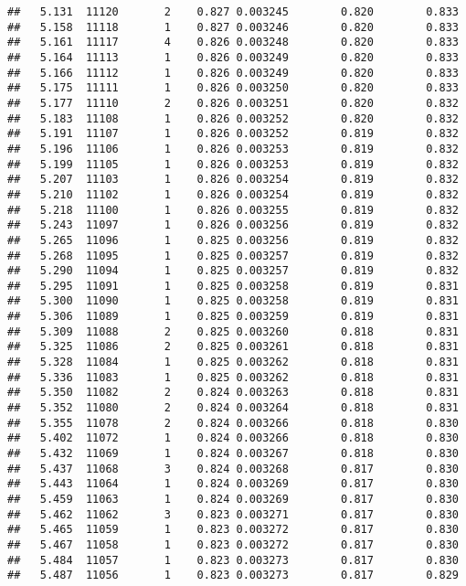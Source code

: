 \documentclass[
]{book}
\begin{document}
\begin{verbatim}
##   5.131  11120       2    0.827 0.003245        0.820        0.833
##   5.158  11118       1    0.827 0.003246        0.820        0.833
##   5.161  11117       4    0.826 0.003248        0.820        0.833
##   5.164  11113       1    0.826 0.003249        0.820        0.833
##   5.166  11112       1    0.826 0.003249        0.820        0.833
##   5.175  11111       1    0.826 0.003250        0.820        0.833
##   5.177  11110       2    0.826 0.003251        0.820        0.832
##   5.183  11108       1    0.826 0.003252        0.820        0.832
##   5.191  11107       1    0.826 0.003252        0.819        0.832
##   5.196  11106       1    0.826 0.003253        0.819        0.832
##   5.199  11105       1    0.826 0.003253        0.819        0.832
##   5.207  11103       1    0.826 0.003254        0.819        0.832
##   5.210  11102       1    0.826 0.003254        0.819        0.832
##   5.218  11100       1    0.826 0.003255        0.819        0.832
##   5.243  11097       1    0.826 0.003256        0.819        0.832
##   5.265  11096       1    0.825 0.003256        0.819        0.832
##   5.268  11095       1    0.825 0.003257        0.819        0.832
##   5.290  11094       1    0.825 0.003257        0.819        0.832
##   5.295  11091       1    0.825 0.003258        0.819        0.831
##   5.300  11090       1    0.825 0.003258        0.819        0.831
##   5.306  11089       1    0.825 0.003259        0.819        0.831
##   5.309  11088       2    0.825 0.003260        0.818        0.831
##   5.325  11086       2    0.825 0.003261        0.818        0.831
##   5.328  11084       1    0.825 0.003262        0.818        0.831
##   5.336  11083       1    0.825 0.003262        0.818        0.831
##   5.350  11082       2    0.824 0.003263        0.818        0.831
##   5.352  11080       2    0.824 0.003264        0.818        0.831
##   5.355  11078       2    0.824 0.003266        0.818        0.830
##   5.402  11072       1    0.824 0.003266        0.818        0.830
##   5.432  11069       1    0.824 0.003267        0.818        0.830
##   5.437  11068       3    0.824 0.003268        0.817        0.830
##   5.443  11064       1    0.824 0.003269        0.817        0.830
##   5.459  11063       1    0.824 0.003269        0.817        0.830
##   5.462  11062       3    0.823 0.003271        0.817        0.830
##   5.465  11059       1    0.823 0.003272        0.817        0.830
##   5.467  11058       1    0.823 0.003272        0.817        0.830
##   5.484  11057       1    0.823 0.003273        0.817        0.830
##   5.487  11056       1    0.823 0.003273        0.817        0.829

\end{verbatim}
\end{document}
